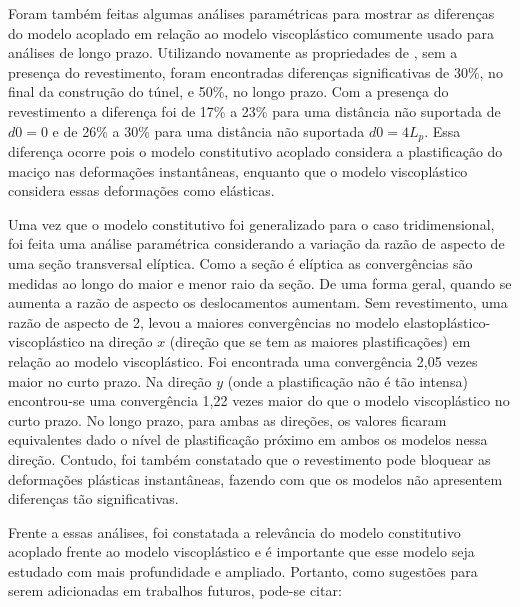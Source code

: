 Foram também feitas algumas análises paramétricas para mostrar as diferenças do modelo acoplado em relação ao modelo viscoplástico comumente usado para análises de longo prazo. Utilizando novamente as propriedades de , sem a presença do revestimento, foram encontradas diferenças significativas de 30\%, no final da construção do túnel, e 50\%, no longo prazo. Com a presença do revestimento a diferença foi de 17\% a 23\% para uma distância não suportada de $d0=0$ e de 26\% a 30\% para uma distância não suportada $d0=4L_p$. Essa diferença ocorre pois o modelo constitutivo acoplado considera a plastificação do maciço nas deformações instantâneas, enquanto que o modelo viscoplástico considera essas deformações como elásticas.

Uma vez que o modelo constitutivo foi generalizado para o caso tridimensional, foi feita uma análise paramétrica considerando a variação da razão de aspecto de uma seção transversal elíptica. Como a seção é elíptica as convergências são medidas ao longo do maior e menor raio da seção. De uma forma geral, quando se aumenta a razão de aspecto os deslocamentos aumentam. Sem revestimento, uma razão de aspecto de 2, levou a maiores convergências no modelo elastoplástico-viscoplástico na direção $x$ (direção que se tem as maiores plastificações) em relação ao modelo viscoplástico. Foi encontrada uma convergência 2,05 vezes maior no curto prazo. Na direção $y$ (onde a plastificação não é tão intensa) encontrou-se uma convergência 1,22 vezes maior do que o modelo viscoplástico no curto prazo. No longo prazo, para ambas as direções, os valores ficaram equivalentes dado o nível de plastificação próximo em ambos os modelos nessa direção. Contudo, foi também constatado que o revestimento pode bloquear as deformações plásticas instantâneas, fazendo com que os modelos não apresentem diferenças tão significativas.

Frente a essas análises, foi constatada a relevância do modelo constitutivo acoplado frente ao modelo viscoplástico e é importante que esse modelo seja estudado com mais profundidade e ampliado. Portanto, como sugestões para serem adicionadas em trabalhos futuros, pode-se citar:

